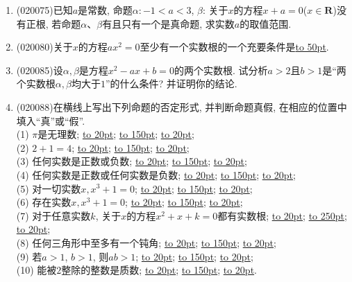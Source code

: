 \documentclass[10pt,a4paper]{article}
\newcommand{\blank}[1]{\underline{\hbox to #1pt{}}}
\begin{document}
\begin{enumerate}[1.]
(16) 空集是任何集合的真子集;\blank{50};\\
(17) 若$x\in \mathbf{R}$, 则方程$x^2-x+1=0$不成立;\blank{50};\\
(18) 若$A\cap B\ne \varnothing$, $B\subset C$, 则$A\cap C\ne \varnothing$;\blank{50};\\
(19) 存在一个三角形, 它的任意两边的平方和小于第三边的平方;\blank{50};\\
(20) 对于任意一个三角形, 存在一组两边的平方和不等于第三边的平方;\blank{50}.
\item {\tiny (020075)}已知$a$是常数, 命题$\alpha :-1<a<3$, $\beta$: 关于$x$的方程$x+a=0$($x\in \mathbf{R}$)没有正根, 若命题$\alpha$、$\beta$有且只有一个是真命题, 求实数$a$的取值范围.
\item {\tiny (020080)}关于$x$的方程$ax^2=0$至少有一个实数根的一个充要条件是\blank{50}.
\item {\tiny (020085)}设$\alpha,\beta$是方程$x^2-ax+b=0$的两个实数根. 试分析$a>2$且$b>1$是``两个实数根$\alpha,\beta$均大于$1$''的什么条件? 并证明你的结论.
\item {\tiny (020088)}在横线上写出下列命题的否定形式, 并判断命题真假, 在相应的位置中填入``真''或``假''.\\
(1) $\pi$是无理数; \blank{20}; \blank{150}; \blank{20};\\
(2) $2+1=4$;  \blank{20}; \blank{150}; \blank{20};\\
(3) 任何实数是正数或负数;  \blank{20}; \blank{150}; \blank{20};\\
(4) 任何实数是正数或任何实数是负数;  \blank{20}; \blank{150}; \blank{20};\\
(5) 对一切实数$x, x^3+1=0$;  \blank{20}; \blank{150}; \blank{20};\\
(6) 存在实数$x, x^3+1=0$;  \blank{20}; \blank{150}; \blank{20};\\
(7) 对于任意实数$k$, 关于$x$的方程$x^2+x+k=0$都有实数根;  \blank{20}; \blank{250}; \blank{20};\\
(8) 任何三角形中至多有一个钝角;  \blank{20}; \blank{150}; \blank{20};\\
(9) 若$a>1$, $b>1$, 则$ab>1$;  \blank{20}; \blank{150}; \blank{20};\\
(10) 能被$2$整除的整数是质数;  \blank{20}; \blank{150}; \blank{20}.\\
\end{enumerate}
\end{document}

